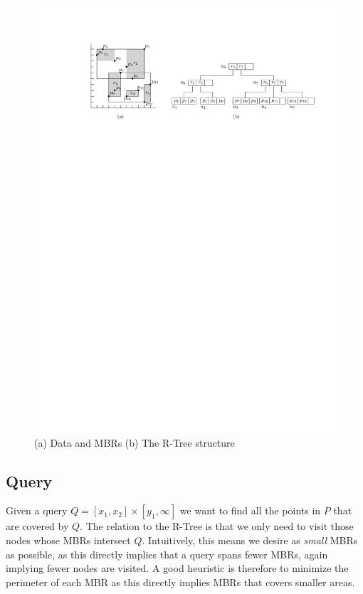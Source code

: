 \documentclass[twoside,11pt,openright]{report}
\begin{document}
\begin{figure}[h]
	\centering
     \includegraphics[width=\textwidth]{../figures/r_tree_data_and_mbrs}
     \caption{(a) Data and MBRs (b) The R-Tree structure}
     \label{fig:r_tree_structure}
\end{figure}

\subsection{Query}
Given a query $Q = \left[x_1,x_2\right] \times \left[y_1,\infty\right]$ we want to find all the points in $P$ that are covered by $Q$. The relation to the R-Tree is that we only need to visit those nodes whose MBRs intersect $Q$. Intuitively, this means we desire as \textit{small} MBRs as possible, as this directly implies that a query spans fewer MBRs, again implying fewer nodes are visited. A good heuristic is therefore to minimize the perimeter of each MBR as this directly implies MBRs that covers smaller areas.
\end{document}
